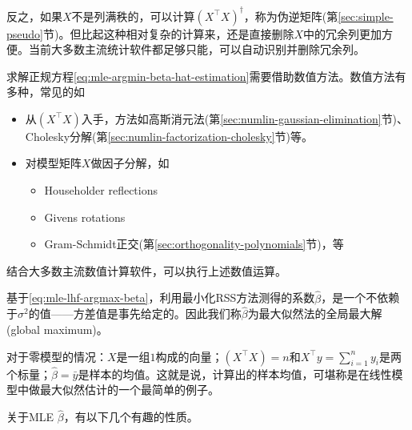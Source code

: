 反之，如果$X$不是列满秩的，可以计算$\left( X^{\top} X \right)^{\dagger}$，称为伪逆矩阵(第\ref{sec:simple-pseudo}节)。但比起这种相对复杂的计算来，还是直接删除$X$中的冗余列更加方便。当前大多数主流统计软件都足够只能，可以自动识别并删除冗余列。

求解正规方程\eqref{eq:mle-argmin-beta-hat-estimation}需要借助数值方法。数值方法有多种，常见的如
\begin{itemize}
  \item 从$\left( X^{\top} X \right)$入手，方法如高斯消元法(第\ref{sec:numlin-gaussian-elimination}节)、Cholesky分解(第\ref{sec:numlin-factorization-cholesky}节)等。
  \item 对模型矩阵$X$做因子分解，如
  \begin{itemize}
    \item Householder reflections
    \item Givens rotations
    \item Gram-Schmidt正交(第\ref{sec:orthogonality-polynomials}节)，等
  \end{itemize}
\end{itemize}
结合大多数主流数值计算软件，可以执行上述数值运算。

基于\eqref{eq:mle-lhf-argmax-beta}，利用最小化RSS方法测得的系数$\hat{\beta}$，是一个不依赖于$\sigma^{2}$的值——方差值是事先给定的。因此我们称$\hat{\beta}$为最大似然法的全局最大解(global maximum)。

对于零模型的情况：$X$是一组$1$构成的向量；$\left( X^{\top} X \right) = n$和$X^{\top} y = \sum_{i=1}^{n} y_{i}$是两个标量；$\hat{\beta} = \bar{y}$是样本的均值。这就是说，计算出的样本均值，可堪称是在线性模型中做最大似然估计的一个最简单的例子。

关于MLE $\hat{\beta}$，有以下几个有趣的性质。

